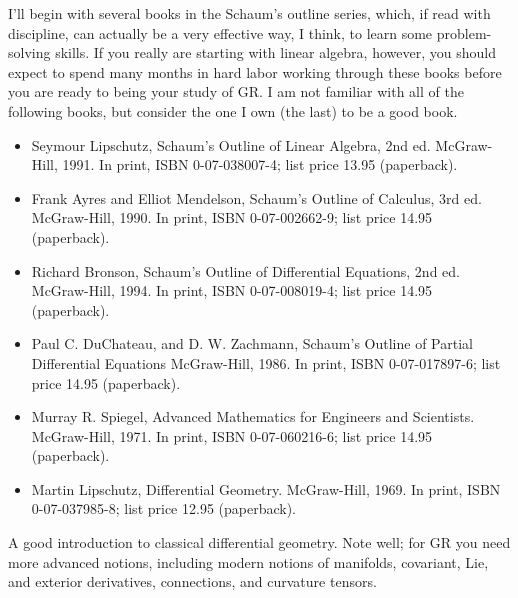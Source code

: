 \documentclass[10pt,a4paper]{book}
\theoremstyle{definition}
\begin{document}
I'll begin with several books in the Schaum's outline series, which, if read with discipline, can actually be a very effective way, I think, to learn some problem-solving skills.  If you really are starting with linear algebra, however, you should expect to spend many months in hard labor working through these books before you are ready to being your study of GR.  I am not familiar with all of the following books, but consider the one I own (the last) to be a good book.

\begin{itemize}
\item Seymour Lipschutz,
Schaum's Outline of Linear Algebra, 2nd ed.
McGraw-Hill, 1991.
In print, ISBN 0-07-038007-4; list price 13.95 (paperback).

\item Frank Ayres and Elliot Mendelson,
Schaum's Outline of Calculus, 3rd ed.
McGraw-Hill, 1990.
In print, ISBN 0-07-002662-9; list price 14.95 (paperback).

\item Richard Bronson,
Schaum's Outline of Differential Equations, 2nd ed.
McGraw-Hill, 1994.
In print, ISBN 0-07-008019-4; list price 14.95 (paperback).

\item Paul C. DuChateau, and D. W. Zachmann,
Schaum's Outline of Partial Differential Equations
McGraw-Hill, 1986.
In print, ISBN 0-07-017897-6; list price 14.95 (paperback).

\item Murray R. Spiegel,
Advanced Mathematics for Engineers and Scientists.
McGraw-Hill, 1971.
In print, ISBN 0-07-060216-6; list price 14.95 (paperback).

\item Martin Lipschutz,
Differential Geometry.
McGraw-Hill, 1969.
In print, ISBN 0-07-037985-8; list price 12.95 (paperback).
\end{itemize}

A good introduction to classical differential geometry.  Note well; for GR you need more advanced notions, including modern notions of manifolds, covariant, Lie, and exterior derivatives, connections, and curvature tensors.
\end{document}
